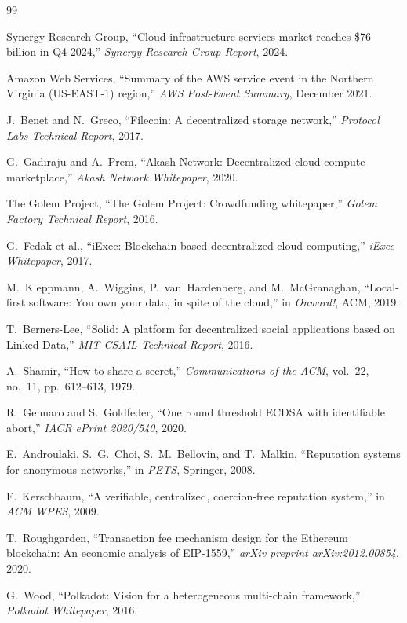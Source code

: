 \begin{thebibliography}{99}

Synergy Research Group, ``Cloud infrastructure services market reaches \$76 billion in Q4 2024,'' \emph{Synergy Research Group Report}, 2024.

Amazon Web Services, ``Summary of the AWS service event in the Northern Virginia (US-EAST-1) region,'' \emph{AWS Post-Event Summary}, December 2021.

J.~Benet and N.~Greco, ``Filecoin: A decentralized storage network,'' \emph{Protocol Labs Technical Report}, 2017.

G.~Gadiraju and A.~Prem, ``Akash Network: Decentralized cloud compute marketplace,'' \emph{Akash Network Whitepaper}, 2020.

The Golem Project, ``The Golem Project: Crowdfunding whitepaper,'' \emph{Golem Factory Technical Report}, 2016.

G.~Fedak et al., ``iExec: Blockchain-based decentralized cloud computing,'' \emph{iExec Whitepaper}, 2017.

M.~Kleppmann, A.~Wiggins, P.~van~Hardenberg, and M.~McGranaghan, ``Local-first software: You own your data, in spite of the cloud,'' in \emph{Onward!}, ACM, 2019.

T.~Berners-Lee, ``Solid: A platform for decentralized social applications based on Linked Data,'' \emph{MIT CSAIL Technical Report}, 2016.

A.~Shamir, ``How to share a secret,'' \emph{Communications of the ACM}, vol.~22, no.~11, pp.~612--613, 1979.

R.~Gennaro and S.~Goldfeder, ``One round threshold ECDSA with identifiable abort,'' \emph{IACR ePrint 2020/540}, 2020.

E.~Androulaki, S.~G.~Choi, S.~M.~Bellovin, and T.~Malkin, ``Reputation systems for anonymous networks,'' in \emph{PETS}, Springer, 2008.

F.~Kerschbaum, ``A verifiable, centralized, coercion-free reputation system,'' in \emph{ACM WPES}, 2009.

T.~Roughgarden, ``Transaction fee mechanism design for the Ethereum blockchain: An economic analysis of EIP-1559,'' \emph{arXiv preprint arXiv:2012.00854}, 2020.

G.~Wood, ``Polkadot: Vision for a heterogeneous multi-chain framework,'' \emph{Polkadot Whitepaper}, 2016.

\end{thebibliography}

